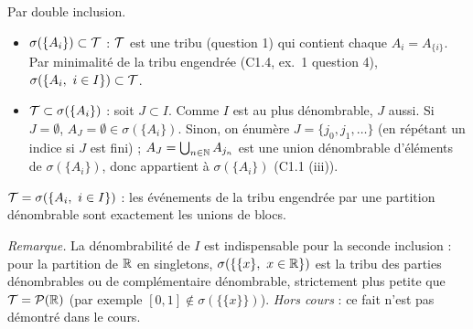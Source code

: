 \documentclass[11pt,a4paper]{article}
\begin{document}
\begin{exo}
Par double inclusion.
\begin{itemize}
  \item $\sigma(\{A_i\})\subset\mathcal{T}$ : $\mathcal{T}$ est une tribu (question 1) qui contient chaque $A_i=A_{\{i\}}$. Par minimalité de la
  tribu engendrée (C1.4, ex.~1 question 4), $\sigma(\{A_i,\ i\in I\})\subset\mathcal{T}$.
  \item $\mathcal{T}\subset\sigma(\{A_i\})$ : soit $J\subset I$. Comme $I$ est au plus dénombrable, $J$ aussi. Si $J=\emptyset$, $A_J=\emptyset\in\sigma(\{A_i\})$.
  Sinon, on énumère $J=\{j_0,j_1,\dots\}$ (en répétant un indice si $J$ est fini) ; $A_J=\bigcup_{n\in\mathbb{N}}A_{j_n}$ est une union
  dénombrable d'éléments de $\sigma(\{A_i\})$, donc appartient à $\sigma(\{A_i\})$ (C1.1 (iii)).
\end{itemize}
\begin{resultat}
$\mathcal{T}=\sigma(\{A_i,\ i\in I\})$ : les événements de la tribu engendrée par une partition dénombrable sont exactement les unions de blocs.
\end{resultat}
\textit{Remarque.} La dénombrabilité de $I$ est indispensable pour la seconde inclusion : pour la partition de $\mathbb{R}$ en singletons,
$\sigma(\{\{x\},\ x\in\mathbb{R}\})$ est la tribu des parties dénombrables ou de complémentaire dénombrable, strictement plus petite que $\mathcal{T}=\mathcal{P}(\mathbb{R})$
(par exemple $[0,1]\notin\sigma(\{\{x\}\})$). \emph{Hors cours} : ce fait n'est pas démontré dans le cours.
\end{exo}
\end{document}
